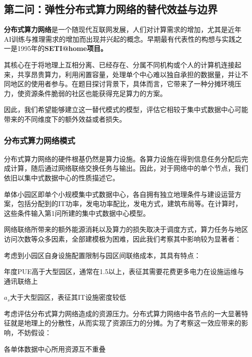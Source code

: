 ﻿%
\subsection{第二问：弹性分布式算力网络的替代效益与边界}\label{sec:q2}

\textbf{分布式算力网络}是一个随现代互联网发展，人们对计算需求的增加，尤其是近年AI训练与推理需求的增加而出现并兴起的概念。早期最有代表性的构想与实践之一是1995年的\textbf{SETI@home项目\cite{q2cref01}。}

其核心在于将地理上互相分离、已经存在、分属不同机构或个人的计算机连接起来，共享昂贵算力，利用闲置容量，处理单个中心难以独自承担的数据量，并让不同地区的使用者参与。在题目探讨背景下，具体而言，它带来了一种分摊环境压力，使资源条件脆弱的社区也能获得充足算力的方案。

因此，我们希望能够建立这一替代模式的模型，评估它相较于集中式数据中心可能带来的不同维度下的额外效益或者损失。

\subsubsection{分布式算力网络模式}\label{sec:q2-network}

分布式算力网络的硬件根基仍然是算力设施。各算力设施在得到信息任务分配后完成计算，随后通过网络联络交换任务与输出。因此，对于网络中的单个节点，我们依旧以集中式数据中心的性质描述它。

\begin{asum}\label{asum:node}
单体小园区即单个小规模集中式数据中心，各自拥有独立地理条件与建设运营方案，包括分配到的IT功率，发电功率配比，发电方式，建筑布局等。在计算时，这些条件输入第1问所建的集中式数据中心模型。
\end{asum}

网络联络所带来的额外能源消耗以及算力的损失取决于调度方式，算力任务与地区访问次数等众多因素\cite{q2cref03,q2cref02}，全部建模极为困难，因此我们考察其中影响较为显著者：

考虑到小园区自身设施配置限制与园区间联络成本，其具有特点：

年度PUE高于大型园区，通常在1.5以上，表征其需要花费更多电力在设施运维与通讯联络上

$a_s$大于大型园区，表征其IT设施密度较低

考虑评估分布式算力网络造成的资源压力。分布式算力网络中各节点的一大显著特征就是地理上的分散性，从而实现了资源压力的分摊。为了考察这一效应带来的影响，不妨假设：

\begin{asum}\label{asum:no-overlap}
各单体数据中心所用资源互不重叠
\end{asum}

